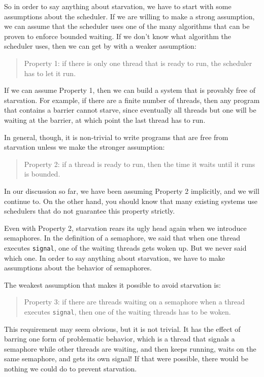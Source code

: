 \documentclass{book}
\begin{document}
So in order to say anything about starvation, we have to start
with some assumptions about the scheduler.  If we are willing
to make a strong assumption, we can assume that the scheduler
uses one of the many algorithms that can be proven to enforce
bounded waiting.  If we don't know what algorithm the scheduler
uses, then we can get by with a weaker assumption:

\begin{quote}
Property 1: if there is only one thread that is ready to
run, the scheduler has to let it run.
\end{quote}

If we can assume Property 1, then we can build a system
that is provably free of starvation.  For example, if there
are a finite number of threads, then any program that contains
a barrier cannot starve, since eventually all threads but one
will be waiting at the barrier, at which point the last thread
has to run.

In general, though, it is non-trivial to write programs that
are free from starvation unless we make the stronger
assumption:

\begin{quote}
Property 2: if a thread is ready to run, then the time it
waits until it runs is bounded.
\end{quote}

In our discussion so far, we have been assuming Property 2
implicitly, and we will continue to.  On the other hand,
you should know that many existing systems use schedulers
that do not guarantee this property strictly.

Even with Property 2, starvation rears its ugly head again
when we introduce semaphores.  In the definition of a semaphore,
we said that when one thread executes {\tt signal}, one of
the waiting threads gets woken up.  But we never said which one.
In order to say anything about starvation, we have to
make assumptions about the behavior of semaphores.

The weakest assumption that makes it possible to avoid
starvation is:

\begin{quote}
Property 3: if there are threads waiting on a semaphore when
a thread executes {\tt signal}, then one of the waiting threads
has to be woken.
\end{quote}

This requirement may seem obvious, but it is not trivial.  It has the
effect of barring one form of problematic behavior, which is a thread
that signals a semaphore while other threads are waiting, and then
keeps running, waits on the same semaphore, and gets its own signal!
If that were possible, there would be nothing we
could do to prevent starvation.
\end{document}
